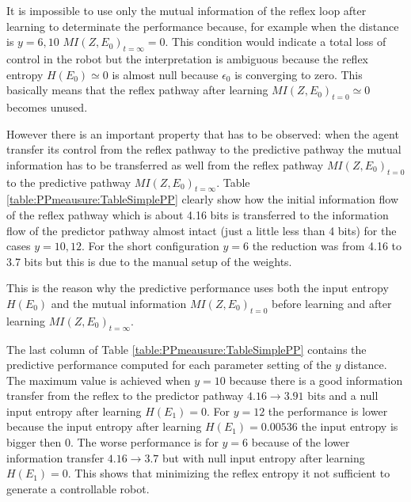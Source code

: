 It is impossible to use only the mutual information of the reflex loop after learning
to determinate the performance because, for example when the distance is $y=6,10$
$MI(Z,E_0)_{t=\infty}=0$. This condition would indicate a total loss of control
in the robot but the interpretation is ambiguous because the reflex entropy $H(E_0)\simeq 0$
is almost null because $\epsilon_0$ is converging to zero. This basically means that 
the reflex pathway after learning $MI(Z,E_0)_{t=0} \simeq 0$ becomes unused.

However there is an important property that has to be observed: when the agent
transfer its control from the reflex pathway to the predictive pathway the mutual information
has to be transferred as well from the reflex pathway $MI(Z,E_0)_{t=0}$ to the
predictive pathway $MI(Z,E_0)_{t=\infty}$.
Table \ref{table:PPmeausure:TableSimplePP} clearly show how the initial information flow
of the reflex pathway which is about 4.16 bits is transferred to the information flow
of the predictor pathway almost intact (just a little less than 4 bits) for the cases
$y=10,12$. For the short configuration $y=6$ the reduction was from 4.16 to 3.7 bits
but this is due to the manual setup of the weights.

This is the reason why the predictive performance uses both the input entropy 
$H(E_{0})$ and the mutual information $MI(Z,E_0)_{t=0}$ before learning and
after learning $MI(Z,E_0)_{t=\infty}$.

The last column of Table \ref{table:PPmeausure:TableSimplePP} contains the predictive
performance computed for each parameter setting of the $y$ distance.
The maximum value is achieved when $y=10$ because there is a good information transfer
from the reflex to the predictor pathway $4.16 \rightarrow 3.91 $ bits and a null
input entropy after learning $H(E_1)=0$.
For $y=12$ the performance is lower because the input entropy after learning
$H(E_1)=0.00536$ the input entropy is bigger then 0.
The worse performance is for $y=6$ because of the lower information transfer
$4.16 \rightarrow 3.7 $ but with null input entropy after learning $H(E_1)=0$.
This shows that minimizing the reflex entropy it not sufficient to generate a
controllable robot.


